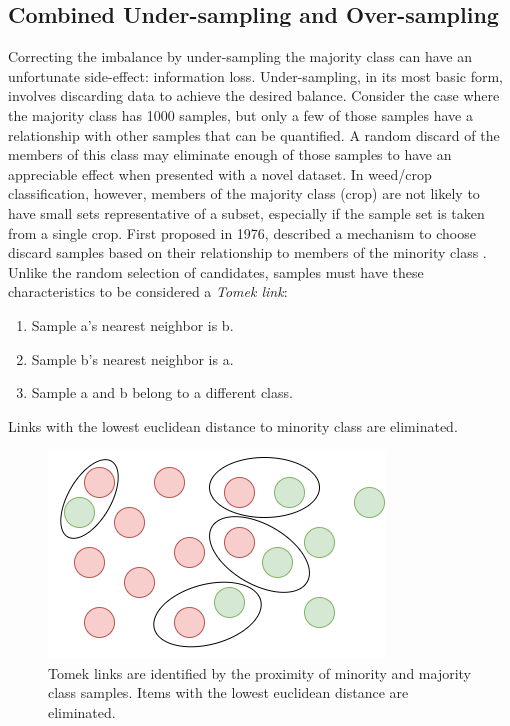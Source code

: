 \documentclass[letterpaper, notitlepage]{report}
\begin{document}
\subsection{Combined Under-sampling and Over-sampling}
\label{section:under}
Correcting the imbalance by under-sampling the majority class can have an unfortunate side-effect: information loss. Under-sampling, in its most basic form, involves discarding data to achieve the desired balance. Consider the case where the majority class has 1000 samples, but only a few of those samples have a relationship with other samples that can be quantified. A random discard of the members of this class may eliminate enough of those samples to have an appreciable effect when presented with a novel dataset. In weed/crop classification, however, members of the majority class (crop) are not likely to have small sets representative of a subset, especially if the sample set is taken from a single crop.
First proposed in 1976, \citeauthor{Tomek1976-bg} described a mechanism to choose discard samples based on their relationship to members of the minority class \parencite{Tomek1976-bg}. Unlike the random selection of candidates, samples must have these characteristics to be considered a \textit{Tomek link}:
\begin{enumerate}
\item{Sample a’s nearest neighbor is b.}
\item{Sample b’s nearest neighbor is a.}
\item{Sample a and b belong to a different class.}
\end{enumerate}
Links with the lowest euclidean distance to  minority class are eliminated.
\begin{figure}[H]
	\centering
	\includegraphics[scale=0.30]{./figures/tomek-a.png}
	\caption[Tomek links]{Tomek links are identified by the proximity of minority and majority class samples. Items with the lowest euclidean distance are eliminated.}
	\label{fig:tomek}
\end{figure}
\end{document}
